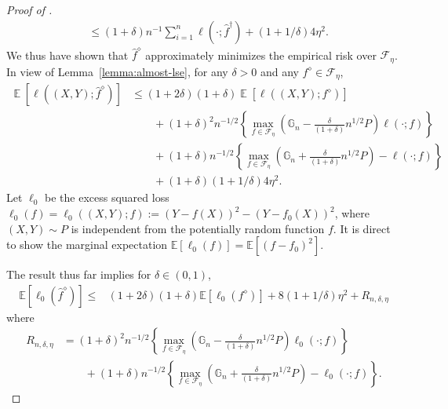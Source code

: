 \documentclass[12pt]{article}
\DeclareMathOperator*{\E}{\mathbb{E}}
\begin{document}
\begin{appendices}
\begin{proof}[Proof of ]
\begin{equation*}
\begin{aligned}
& \leq(1+\delta) n^{-1} \sum_{i=1}^n \ell(\cdot ; \widehat{f}^{\dagger})+(1+1 / \delta) 4 \eta^2.
\end{aligned}
\end{equation*}
We thus have shown that $\widehat f^\diamond$ approximately minimizes the empirical risk over $\mathcal{F}_\eta$. In view of Lemma~\ref{lemma:almost-lse}, for any $\delta >0$ and any $f^\diamond\in\mathcal{F}_\eta$, 
\begin{align*}
	\E[\ell((X, Y); \widehat f^\diamond)] &\le (1+2\delta)(1+\delta)\E[\ell((X,Y); f^\diamond)]\\
	&\qquad+(1+\delta)^2n^{-1/2}\left\{\max_{f \in \mathcal{F}_\eta}\left(\mathbb{G}_n-\frac{\delta}{(1+\delta)} n^{1/2}P\right)\ell(\cdot; f)\right\}\\
    &\qquad + (1+\delta)n^{-1/2} \left\{\max_{f \in \mathcal{F}_\eta}\left(\mathbb{G}_n+\frac{\delta}{(1+\delta)} n^{1/2}P\right)-\ell(\cdot; f)\right\} \nonumber\\
    &\qquad + (1+\delta)(1+1/\delta)4\eta^2.\nonumber
\end{align*}
Let $\ell_0$ be the excess squared loss $\ell_0(f) = \ell_0((X,Y); f) := (Y-f(X))^2 - (Y-f_0(X))^2$, where $(X,Y)\sim P$ is independent from the potentially random function $f$. It is direct to show the marginal expectation $\mathbb{E}[\ell_0(f)] = \mathbb{E}[(f - f_0)^2]$. 

The result thus far implies for $\delta \in (0,1)$,
    \begin{equation}\label{eq: after bound the non-centered}
\begin{aligned}
\mathbb{E}[\ell_0(\widehat{f}^{\diamond})] \leq & (1+2 \delta)(1+\delta) \mathbb{E}[\ell_0(f^{\diamond})] +8(1+1 / \delta)  \eta^2 +R_{n, \delta, \eta}
\end{aligned}
\end{equation}
where 
\begin{equation}\label{eq:R-definition}
\begin{aligned}
R_{n, \delta, \eta} &= (1+\delta)^2n^{-1/2}\left\{\max_{f \in \mathcal{F}_\eta}\left(\mathbb{G}_n-\frac{\delta}{(1+\delta)} n^{1/2}P\right)\ell_0(\cdot; f)\right\}\\
    &\qquad + (1+\delta)n^{-1/2} \left\{\max_{f \in \mathcal{F}_\eta}\left(\mathbb{G}_n+\frac{\delta}{(1+\delta)} n^{1/2}P\right)-\ell_0(\cdot; f)\right\}.
\end{aligned}
\end{equation}


\end{proof}
\end{appendices}
\end{document}
